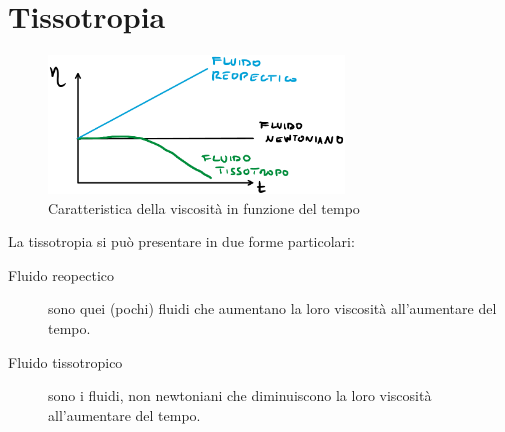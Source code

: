 \section{Tissotropia}
\begin{figure}
\centering
\includegraphics[width = 0.7\textwidth]{gfx/Tissotropia}
\caption{Caratteristica della viscosità in funzione del tempo}
\label{fig:Tissotropia}
\end{figure}
La tissotropia si può presentare in due forme particolari:
\begin{description}
\item[Fluido reopectico] sono quei (pochi) fluidi che aumentano la loro viscosità all'aumentare del tempo.
\item[Fluido tissotropico] sono i fluidi, non newtoniani che diminuiscono la loro viscosità all'aumentare del tempo.
\end{description}

